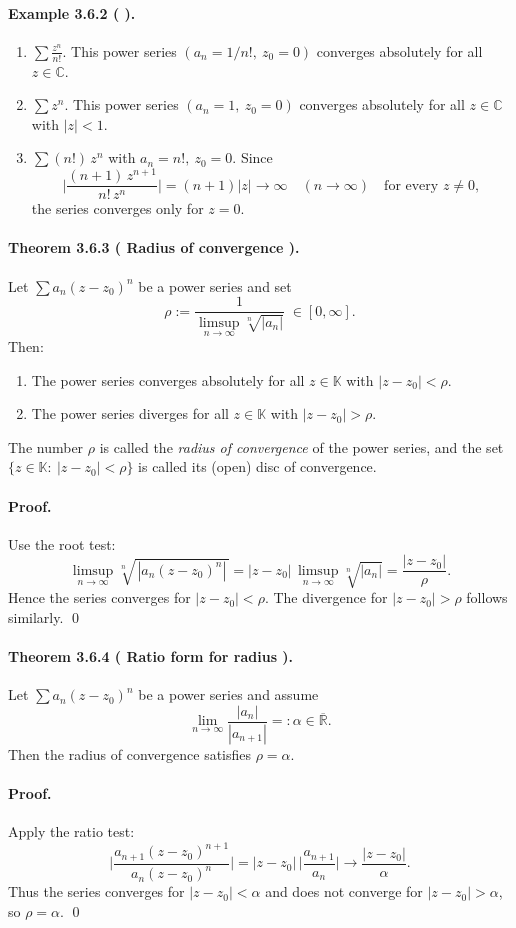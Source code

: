 \documentclass[12pt,a4paper]{article}
\newcommand{\R}{\mathbb{R}}
\newcommand{\C}{\mathbb{C}}
\newcommand{\K}{\mathbb{K}} %
\newcommand{\NumberedTheorem}[3]{%
\paragraph*{Theorem #1 ( #2 ).} #3\par}
\newcommand{\NumberedExample}[3]{%
\paragraph*{Example #1 ( #2 ).} #3\par}
\theoremstyle{plain}
\theoremstyle{definition}
\theoremstyle{remark}
\begin{document}
\NumberedExample{3.6.2}{}{
\begin{enumerate}[label={(\arabic*)}, leftmargin=*]
	\item $\displaystyle \sum \frac{z^{n}}{n!}$. This power series $(a_n=1/n!,\ z_0=0)$ converges absolutely for all $z\in\C$.
	\item $\displaystyle \sum z^{n}$. This power series $(a_n=1,\ z_0=0)$ converges absolutely for all $z\in\C$ with $|z|<1$.
	\item $\displaystyle \sum (n!)\, z^{n}$ with $a_n=n!,\ z_0=0$. Since
	\[
		\Bigg|\frac{(n+1)\,z^{n+1}}{n!\,z^{n}}\Bigg| = (n+1)|z| \longrightarrow \infty \quad (n\to\infty) \quad \text{for every } z\ne0,
	\]
	the series converges only for $z=0$.
\end{enumerate}}

\NumberedTheorem{3.6.3}{Radius of convergence}{Let $\sum a_n (z-z_0)^n$ be a power series and set
\[
	\rho := \frac{1}{\displaystyle \limsup_{n\to\infty} \sqrt[n]{|a_n|}}\;\in [0,\infty].
\]
Then:
\begin{enumerate}[label={(\arabic*)}, leftmargin=*]
	\item The power series converges absolutely for all $z\in\K$ with $|z-z_0|<\rho$.
	\item The power series diverges for all $z\in\K$ with $|z-z_0|>\rho$.
\end{enumerate}}
The number $\rho$ is called the \emph{radius of convergence} of the power series, and the set $\{z\in\K:\ |z-z_0|<\rho\}$ is called its (open) disc of convergence.

\paragraph{Proof.}
Use the root test:
\[
	\limsup_{n\to\infty} \sqrt[n]{\,|a_n (z-z_0)^n|\,}
	 = |z-z_0|\, \limsup_{n\to\infty} \sqrt[n]{|a_n|}
	 = \frac{|z-z_0|}{\rho}.
\]
Hence the series converges for $|z-z_0|<\rho$. The divergence for $|z-z_0|>\rho$ follows similarly. \qed

\NumberedTheorem{3.6.4}{Ratio form for radius}{Let $\sum a_n (z-z_0)^n$ be a power series and assume
\[
	\lim_{n\to\infty} \frac{|a_n|}{|a_{n+1}|} =: \alpha \in \overline{\R}.
\]
Then the radius of convergence satisfies $\rho = \alpha$.}
\paragraph{Proof.}
Apply the ratio test:
\[
	\Bigg|\frac{a_{n+1}(z-z_0)^{n+1}}{a_n (z-z_0)^n}\Bigg|
	 = |z-z_0|\, \Bigg|\frac{a_{n+1}}{a_n}\Bigg| \longrightarrow \frac{|z-z_0|}{\alpha}.
\]
Thus the series converges for $|z-z_0|<\alpha$ and does not converge for $|z-z_0|>\alpha$, so $\rho=\alpha$. \qed
\end{document}
